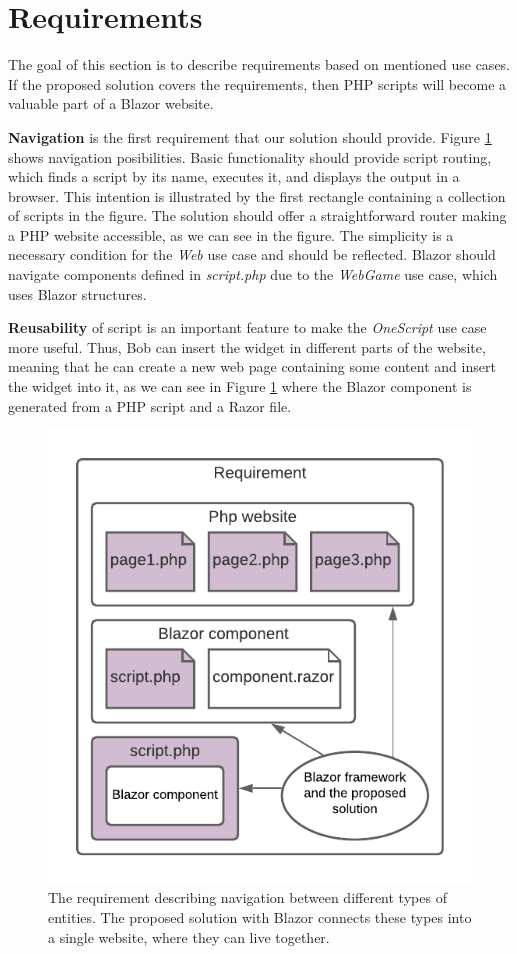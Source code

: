 \section{Requirements}

The goal of this section is to describe requirements based on mentioned use cases.
If the proposed solution covers the requirements, then PHP scripts will become a valuable part of a Blazor website.
\par
\textbf{Navigation} is the first requirement that our solution should provide.
Figure \ref{img10:scripts} shows navigation posibilities.
Basic functionality should provide script routing, which finds a script by its name, executes it, and displays the output in a browser.
This intention is illustrated by the first rectangle containing a collection of scripts in the figure.
The solution should offer a straightforward router making a PHP website accessible, as we can see in the figure.
The simplicity is a necessary condition for the \textit{Web} use case and should be reflected.
Blazor should navigate components defined in \textit{script.php} due to the \textit{WebGame} use case, which uses Blazor structures.
\par
\textbf{Reusability} of script is an important feature to make the \textit{OneScript} use case more useful.
Thus, Bob can insert the widget in different parts of the website, meaning that he can create a new web page containing some content and insert the widget into it, as we can see in Figure \ref{img10:scripts} where the Blazor component is generated from a PHP script and a Razor file.
\par
\begin{figure}
\centering
\includegraphics{./img/Requirement}
\caption{The requirement describing navigation between different types of entities. 
The proposed solution with Blazor connects these types into a single website, where they can live together.
}
\label{img10:scripts}
\end{figure} 
